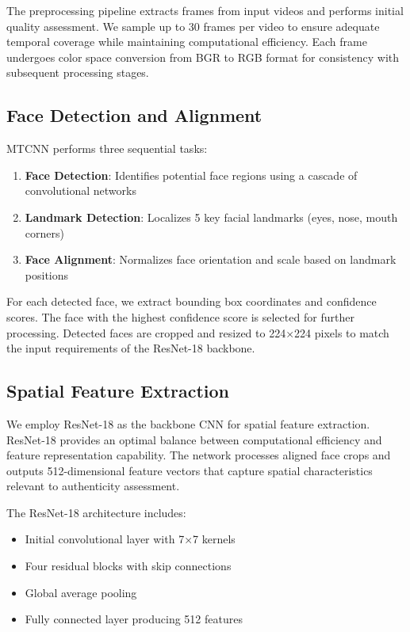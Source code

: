 \documentclass[conference]{IEEEtran}
\begin{document}
The preprocessing pipeline extracts frames from input videos and performs initial quality assessment. We sample up to 30 frames per video to ensure adequate temporal coverage while maintaining computational efficiency. Each frame undergoes color space conversion from BGR to RGB format for consistency with subsequent processing stages.

\subsection{Face Detection and Alignment}

MTCNN performs three sequential tasks:
\begin{enumerate}
\item \textbf{Face Detection}: Identifies potential face regions using a cascade of convolutional networks
\item \textbf{Landmark Detection}: Localizes 5 key facial landmarks (eyes, nose, mouth corners)
\item \textbf{Face Alignment}: Normalizes face orientation and scale based on landmark positions
\end{enumerate}

For each detected face, we extract bounding box coordinates and confidence scores. The face with the highest confidence score is selected for further processing. Detected faces are cropped and resized to 224×224 pixels to match the input requirements of the ResNet-18 backbone.

\subsection{Spatial Feature Extraction}

We employ ResNet-18 as the backbone CNN for spatial feature extraction. ResNet-18 provides an optimal balance between computational efficiency and feature representation capability. The network processes aligned face crops and outputs 512-dimensional feature vectors that capture spatial characteristics relevant to authenticity assessment.

The ResNet-18 architecture includes:
\begin{itemize}
\item Initial convolutional layer with 7×7 kernels
\item Four residual blocks with skip connections
\item Global average pooling
\item Fully connected layer producing 512 features
\end{itemize}
\end{document}
